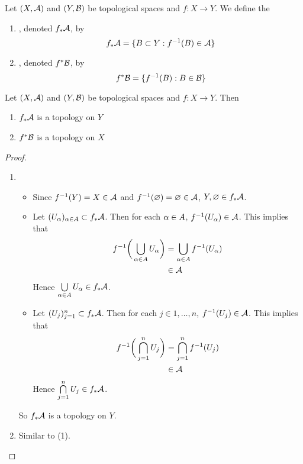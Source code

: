 \documentclass{book}
\begin{document}
	\begin{defn} \ld{}
	Let $(X, \mathcal{A})$ and $(Y,\mathcal{B})$ be topological spaces and $f: X \rightarrow Y$. We define the 
	\begin{enumerate}
	\item {}, denoted $f_*\mathcal{A}$, by 
	$$f_*\mathcal{A} = \{B \subset Y: f^{-1}(B) \in \mathcal{A}\}$$ 
	\item  {}, denoted $f^*\mathcal{B}$, by  
	$$f^*\mathcal{B} = \{f^{-1}(B):  B \in \mathcal{B} \}$$
	\end{enumerate}
	\end{defn}
	
	\begin{ex} \lex{} 
		Let $(X,\mathcal{A})$ and $(Y,\mathcal{B})$ be topological spaces and $f: X \rightarrow Y$. Then 
		\begin{enumerate}
			\item $f_*\mathcal{A}$ is a topology on $Y$
			\item $f^*\mathcal{B}$ is a topology on $X$
		\end{enumerate}
	\end{ex}
	
	\begin{proof}\
		\begin{enumerate}
			\item 
			\begin{itemize}
			\item Since $f^{-1}(Y) = X \in \mathcal{A}$ and $f^{-1}(\varnothing) = \varnothing \in \mathcal{A}$, $Y, \varnothing \in f_*\mathcal{A}$.
			\item Let $(U_{\alpha})_{\alpha \in A} \subset f_*\mathcal{A}$. Then for each $\alpha \in A$, $f^{-1}(U_{\alpha}) \in \mathcal{A}$. This implies that 
			\begin{align*}
			f^{-1}\bigg( \bigcup\limits_{\alpha \in A}U_{\alpha} \bigg) 
			&=  \bigcup\limits_{\alpha \in A} f^{-1}(U_{\alpha}) \\
			& \in \mathcal{A}
			\end{align*}
			Hence $\bigcup\limits_{\alpha \in A}U_{\alpha} \in f_*\mathcal{A}$.
			\item Let $(U_{j})_{j=1}^n \subset f_*\mathcal{A}$. Then for each $j \in {1, \ldots, n}$, $f^{-1}(U_{j}) \in \mathcal{A}$. This implies that 
			\begin{align*}
			f^{-1}\bigg( \bigcap\limits_{j=1}^n U_{j} \bigg) 
			&=  \bigcap\limits_{j=1}^n f^{-1}(U_{j}) \\
			& \in \mathcal{A}
			\end{align*}
			Hence $\bigcap\limits_{j=1}^n U_{j} \in f_*\mathcal{A}$.
			\end{itemize}
			So $f_*\mathcal{A}$ is a topology on $Y$.
			\item Similar to (1).
		\end{enumerate}
	\end{proof}	
	
\end{document}
